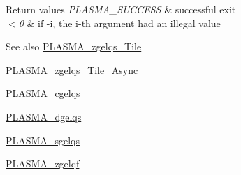 \begin{DoxyRetVals}{Return values}
{\em P\+L\+A\+S\+M\+A\+\_\+\+S\+U\+C\+C\+E\+S\+S} & successful exit \\
\hline
{\em $<$0} & if -\/i, the i-\/th argument had an illegal value\\
\hline
\end{DoxyRetVals}
\begin{DoxySeeAlso}{See also}
\hyperlink{group__PLASMA__Complex64__t__Tile_gaa6c2e67e567c4f9a4e3f3a84e4b54b8c_gaa6c2e67e567c4f9a4e3f3a84e4b54b8c}{P\+L\+A\+S\+M\+A\+\_\+zgelqs\+\_\+\+Tile} 

\hyperlink{group__PLASMA__Complex64__t__Tile__Async_gaea984817531da99d1188623a0822e5f6_gaea984817531da99d1188623a0822e5f6}{P\+L\+A\+S\+M\+A\+\_\+zgelqs\+\_\+\+Tile\+\_\+\+Async} 

\hyperlink{group__PLASMA__Complex32__t_gab6c2a5892b81e8ee9740268d06adf9b1_gab6c2a5892b81e8ee9740268d06adf9b1}{P\+L\+A\+S\+M\+A\+\_\+cgelqs} 

\hyperlink{group__double_ga092545f106c9fae67b82eb65f11ca4ab_ga092545f106c9fae67b82eb65f11ca4ab}{P\+L\+A\+S\+M\+A\+\_\+dgelqs} 

\hyperlink{group__float_ga4bde040498b35dcbc88268de59de7d12_ga4bde040498b35dcbc88268de59de7d12}{P\+L\+A\+S\+M\+A\+\_\+sgelqs} 

\hyperlink{group__PLASMA__Complex64__t_ga8990facf0cb04df2a107c02e5dd5f3f7_ga8990facf0cb04df2a107c02e5dd5f3f7}{P\+L\+A\+S\+M\+A\+\_\+zgelqf} 
\end{DoxySeeAlso}
\hypertarget{group__PLASMA__Complex64__t_ga37e31dd7208585a1720db61e38e31a55_ga37e31dd7208585a1720db61e38e31a55}{}
